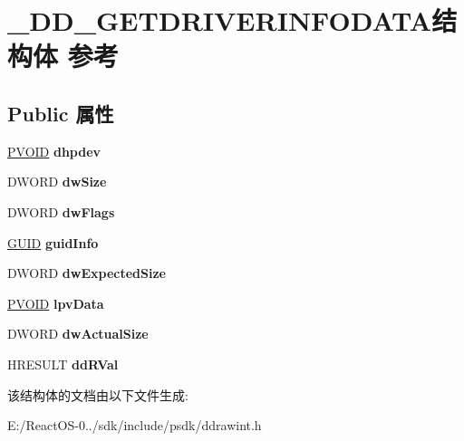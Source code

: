 \hypertarget{struct___d_d___g_e_t_d_r_i_v_e_r_i_n_f_o_d_a_t_a}{}\section{\+\_\+\+D\+D\+\_\+\+G\+E\+T\+D\+R\+I\+V\+E\+R\+I\+N\+F\+O\+D\+A\+T\+A结构体 参考}
\label{struct___d_d___g_e_t_d_r_i_v_e_r_i_n_f_o_d_a_t_a}
\subsection*{Public 属性}
\begin{DoxyCompactItemize}
\item 
\mbox{\label{struct___d_d___g_e_t_d_r_i_v_e_r_i_n_f_o_d_a_t_a_a40675a59ff12f21600d36e65166e360f}} 
\hyperlink{interfacevoid}{P\+V\+O\+ID} {\bfseries dhpdev}
\item 
\mbox{\label{struct___d_d___g_e_t_d_r_i_v_e_r_i_n_f_o_d_a_t_a_a2f94ae4c9b9c0ce28f432e497ee42429}} 
D\+W\+O\+RD {\bfseries dw\+Size}
\item 
\mbox{\label{struct___d_d___g_e_t_d_r_i_v_e_r_i_n_f_o_d_a_t_a_ad5bc2582f4469997d92f5859476473d0}} 
D\+W\+O\+RD {\bfseries dw\+Flags}
\item 
\mbox{\label{struct___d_d___g_e_t_d_r_i_v_e_r_i_n_f_o_d_a_t_a_acfbcbe2922a8d8041497b4ac6307cc1c}} 
\hyperlink{interface_g_u_i_d}{G\+U\+ID} {\bfseries guid\+Info}
\item 
\mbox{\label{struct___d_d___g_e_t_d_r_i_v_e_r_i_n_f_o_d_a_t_a_a24a808af177fc95a75e60407728ec356}} 
D\+W\+O\+RD {\bfseries dw\+Expected\+Size}
\item 
\mbox{\label{struct___d_d___g_e_t_d_r_i_v_e_r_i_n_f_o_d_a_t_a_ad315d2c3a8f651ac2163082e56f0de1c}} 
\hyperlink{interfacevoid}{P\+V\+O\+ID} {\bfseries lpv\+Data}
\item 
\mbox{\label{struct___d_d___g_e_t_d_r_i_v_e_r_i_n_f_o_d_a_t_a_ad6f9b7d89c99865924bc401451954f45}} 
D\+W\+O\+RD {\bfseries dw\+Actual\+Size}
\item 
\mbox{\label{struct___d_d___g_e_t_d_r_i_v_e_r_i_n_f_o_d_a_t_a_a80816553c72a83858547716ff21dff83}} 
H\+R\+E\+S\+U\+LT {\bfseries dd\+R\+Val}
\end{DoxyCompactItemize}


该结构体的文档由以下文件生成\+:\begin{DoxyCompactItemize}
\item 
E\+:/\+React\+O\+S-\/0../sdk/include/psdk/ddrawint.\+h\end{DoxyCompactItemize}
